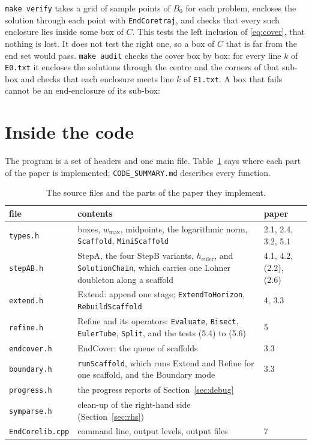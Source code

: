 \documentclass[11pt,a4paper]{article}
\newcommand{\out}[2][]{\VerbatimInput[fontsize=\footnotesize,#1]{#2}}
\newcommand{\file}[1]{\nolinkurl{#1}}
\newcommand{\wmax}{w_{\max}}
\begin{document}
\texttt{make verify} takes a grid of sample points of $B_0$ for each problem,
encloses the solution through each point with \texttt{EndCoretraj}, and checks
that every such enclosure lies inside some box of $C$. This tests the left
inclusion of \eqref{eq:cover}, that nothing is lost. It does not test the
right one, so a box of $C$ that is far from the end set would pass.
\texttt{make audit} checks the cover box by box: for every line $k$ of
\file{E0.txt} it encloses the solutions through the centre and the corners of
that sub-box and checks that each enclosure meets line $k$ of \file{E1.txt}.
A box that fails cannot be an end-enclosure of its sub-box:
\out{out/audit.txt}

\section{Inside the code}\label{sec:code}

The program is a set of headers and one main file. Table~\ref{tab:files}
says where each part of the paper is implemented; \file{CODE_SUMMARY.md}
describes every function.

\begin{table}[htb]
\centering\small
\caption{The source files and the parts of the paper they implement.}
\label{tab:files}
\begin{tabular}{lp{}l}
\toprule
file & contents & paper \\
\midrule
\file{types.h}       & boxes, $\wmax$, midpoints, the logarithmic norm,
                       \texttt{Scaffold}, \texttt{MiniScaffold} & 2.1, 2.4, 3.2, 5.1 \\
\file{stepAB.h}      & StepA, the four StepB variants, $h_{\mathrm{euler}}$,
                       and \texttt{SolutionChain}, which carries one Lohner
                       doubleton along a scaffold & 4.1, 4.2, (2.2), (2.6) \\
\file{extend.h}      & Extend: append one stage; \texttt{ExtendToHorizon},
                       \texttt{RebuildScaffold} & 4, 3.3 \\
\file{refine.h}      & Refine and its operators: \texttt{Evaluate},
                       \texttt{Bisect}, \texttt{EulerTube}, \texttt{Split},
                       and the tests (5.4) to (5.6) & 5 \\
\file{endcover.h}    & EndCover: the queue of scaffolds & 3.3 \\
\file{boundary.h}    & \texttt{runScaffold}, which runs Extend and Refine for
                       one scaffold, and the Boundary mode & 3.3 \\
\file{progress.h}    & the progress reports of Section~\ref{sec:debug} & \\
\file{symparse.h}    & clean-up of the right-hand side
                       (Section~\ref{sec:rhs}) & \\
\file{EndCorelib.cpp} & command line, output levels, output files & 7 \\
\bottomrule
\end{tabular}
\end{table}
\end{document}
